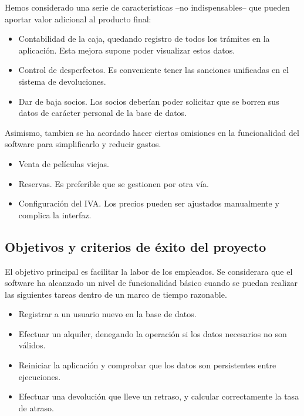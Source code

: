 Hemos considerado una serie de caracteristicas --no indispensables-- que pueden aportar valor adicional al producto final:
\begin{itemize}
	\item Contabilidad de la caja, quedando registro de todos los trámites en la aplicación. Esta mejora supone poder visualizar estos datos.
	\item Control de desperfectos. Es conveniente tener las sanciones unificadas en el sistema de devoluciones.
	\item Dar de baja socios. Los socios deberían poder solicitar que se borren sus datos de carácter personal de la base de datos.
\end{itemize}

Asimismo, tambien se ha acordado hacer ciertas omisiones en la funcionalidad del software para simplificarlo y reducir gastos.
\begin{itemize}
	\item Venta de películas viejas.
	\item Reservas. Es preferible que se gestionen por otra vía.
	\item Configuración del IVA. Los precios pueden ser ajustados manualmente y complica la interfaz.
\end{itemize}


\subsection{Objetivos y criterios de éxito del proyecto}
El objetivo principal es facilitar la labor de los empleados.
Se considerara que el software ha alcanzado un nivel de funcionalidad básico cuando se puedan realizar las siguientes tareas dentro de un marco de tiempo razonable.
\begin{itemize}
	\item Registrar a un usuario nuevo en la base de datos.
	\item Efectuar un alquiler, denegando la operación si los datos necesarios no son válidos.
	\item Reiniciar la aplicación y comprobar que los datos son persistentes entre ejecuciones.
	\item Efectuar una devolución que lleve un retraso, y calcular correctamente la tasa de atraso.
\end{itemize}

